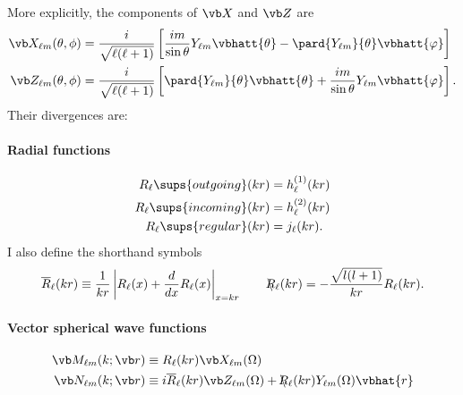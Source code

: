 \documentclass[letterpaper]{article}
\newcommand{\lm}{_{\ell m}}
\newcommand{\Rslash}{\backslash\hspace{-0.08in}R}
\begin{document}
\noindent More explicitly, the components of $\vb X$ and $\vb Z$ are
\begin{align*}
\vb X\lm(\theta, \phi) 
&= 
   \frac{i}{\sqrt{\ell(\ell+1)}}
   \left[  \frac{im}{\sin\theta}Y_{\ell m} \vbhatt{\theta}
           -\pard{Y_{\ell m}}{\theta}\vbhatt{\varphi}
   \right]
\\
\vb Z\lm(\theta, \phi) 
&=
   \frac{i}{\sqrt{\ell(\ell+1)}}
   \left[   \pard{Y_{\ell m}}{\theta}\vbhatt{\theta}
           +\frac{im}{\sin\theta}Y_{\ell m} \vbhatt{\varphi}
   \right].
\end{align*}
Their divergences are:

\paragraph{Radial functions}
\begin{align*}
 R_\ell \sups{outgoing}(kr)  &= h^{(1)}_\ell(kr) \\
 R_\ell \sups{incoming}(kr)  &= h^{(2)}_\ell(kr) \\
 R_\ell \sups{regular}(kr)   &= j_\ell(kr).
\end{align*}
I also define the shorthand symbols
$$ \overline{R}_\ell(kr)
   \equiv 
   \frac{1}{kr}\left|R_\ell(x) + \frac{d}{dx}R_\ell(x)\right|_{x=kr}
   \qquad
   \Rslash_\ell(kr) = -\frac{\sqrt{l(l+1)}}{kr} R_\ell(kr).
$$

\paragraph{Vector spherical wave functions}
\begin{align*} 
 \vb M\lm(k; \vb r) 
&\equiv R_\ell(kr) \vb X\lm(\Omega) 
\\
 \vb N\lm(k; \vb r) &\equiv 
i\overline{R}_\ell(kr) \vb Z\lm(\Omega) + \Rslash_\ell(kr) Y\lm(\Omega) \vbhat{r} 
\end{align*} 
\end{document}
